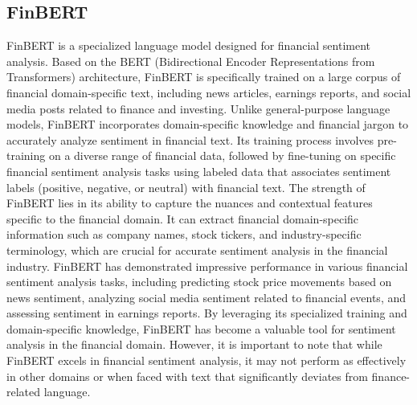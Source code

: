\subsection{FinBERT}
FinBERT is a specialized language model designed for financial sentiment analysis. Based on the BERT (Bidirectional Encoder Representations from Transformers) architecture, FinBERT is specifically trained on a large corpus of financial domain-specific text, including news articles, earnings reports, and social media posts related to finance and investing.
Unlike general-purpose language models, FinBERT incorporates domain-specific knowledge and financial jargon to accurately analyze sentiment in financial text. Its training process involves pre-training on a diverse range of financial data, followed by fine-tuning on specific financial sentiment analysis tasks using labeled data that associates sentiment labels (positive, negative, or neutral) with financial text.
The strength of FinBERT lies in its ability to capture the nuances and contextual features specific to the financial domain. It can extract financial domain-specific information such as company names, stock tickers, and industry-specific terminology, which are crucial for accurate sentiment analysis in the financial industry. FinBERT has demonstrated impressive performance in various financial sentiment analysis tasks, including predicting stock price movements based on news sentiment, analyzing social media sentiment related to financial events, and assessing sentiment in earnings reports.
By leveraging its specialized training and domain-specific knowledge, FinBERT has become a valuable tool for sentiment analysis in the financial domain. However, it is important to note that while FinBERT excels in financial sentiment analysis, it may not perform as effectively in other domains or when faced with text that significantly deviates from finance-related language.
